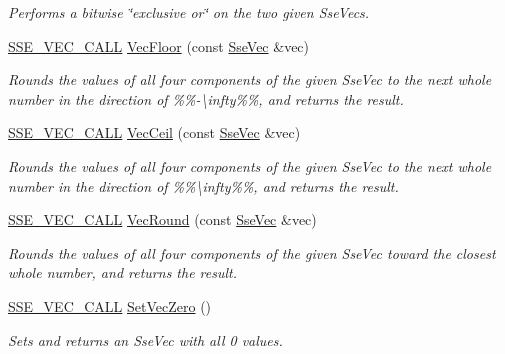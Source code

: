 \begin{DoxyCompactItemize}
\begin{DoxyCompactList}\small\item\em Performs a bitwise \char`\"{}exclusive or\char`\"{} on the two given Sse\+Vecs. \end{DoxyCompactList}\item 
\hyperlink{ssevec__math__defs_8h_a97454f977a5281455cecacce1e8ba670}{S\+S\+E\+\_\+\+V\+E\+C\+\_\+\+C\+A\+L\+L} \hyperlink{group___s_i_m_d_vec_math_gadf0a64c2df9c60c9e8ce9cfa107bdff6}{Vec\+Floor} (const \hyperlink{namespacegfxmath_a0de2243e2b8d0fd46d3af5e036423004}{Sse\+Vec} \&vec)
\begin{DoxyCompactList}\small\item\em Rounds the values of all four components of the given Sse\+Vec to the next whole number in the direction of \%\%-\/\textbackslash{}infty\%\%, and returns the result. \end{DoxyCompactList}\item 
\hyperlink{ssevec__math__defs_8h_a97454f977a5281455cecacce1e8ba670}{S\+S\+E\+\_\+\+V\+E\+C\+\_\+\+C\+A\+L\+L} \hyperlink{group___s_i_m_d_vec_math_ga16c13f89dca63e476b9650929065cc12}{Vec\+Ceil} (const \hyperlink{namespacegfxmath_a0de2243e2b8d0fd46d3af5e036423004}{Sse\+Vec} \&vec)
\begin{DoxyCompactList}\small\item\em Rounds the values of all four components of the given Sse\+Vec to the next whole number in the direction of \%\%\textbackslash{}infty\%\%, and returns the result. \end{DoxyCompactList}\item 
\hyperlink{ssevec__math__defs_8h_a97454f977a5281455cecacce1e8ba670}{S\+S\+E\+\_\+\+V\+E\+C\+\_\+\+C\+A\+L\+L} \hyperlink{group___s_i_m_d_vec_math_gafc1364d5e549d2acc145311d3ea882fe}{Vec\+Round} (const \hyperlink{namespacegfxmath_a0de2243e2b8d0fd46d3af5e036423004}{Sse\+Vec} \&vec)
\begin{DoxyCompactList}\small\item\em Rounds the values of all four components of the given Sse\+Vec toward the closest whole number, and returns the result. \end{DoxyCompactList}\item 
\hyperlink{ssevec__math__defs_8h_a97454f977a5281455cecacce1e8ba670}{S\+S\+E\+\_\+\+V\+E\+C\+\_\+\+C\+A\+L\+L} \hyperlink{group___s_i_m_d_vec_math_ga0f2e48ba414195d54e2edc5d73b829b0}{Set\+Vec\+Zero} ()
\begin{DoxyCompactList}\small\item\em Sets and returns an Sse\+Vec with all 0 values. \end{DoxyCompactList}\item 

\end{DoxyCompactItemize}
